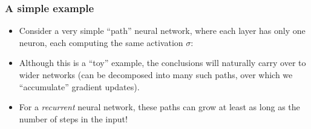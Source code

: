 \documentclass{beamer}
\begin{document}
\begin{frame}
	\frametitle{A simple example}
	\begin{itemize}
		\item Consider a very simple ``path'' neural network, where each layer has only one neuron, each computing the same activation $\sigma$:
	\end{itemize}
	\vfill
	\begin{center}
	\end{center}
	\vfill
	\begin{itemize}
		\item Although this is a ``toy'' example, the conclusions will naturally carry over to wider networks (can be decomposed into many such paths, over which we ``accumulate'' gradient updates). 
		\vfill
		\item For a \emph{recurrent} neural network, these paths can grow at least as long as the number of steps in the input!
	\end{itemize}
\end{frame}
\end{document}
